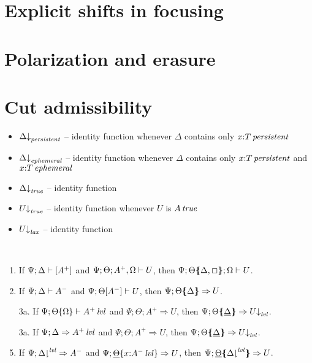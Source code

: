 \section{Explicit shifts in focusing}

\section{Polarization and erasure}

\section{Cut admissibility}

\begin{itemize}
\item $\Delta{\downarrow}_{{\it persistent}}$ -- identity function whenever $\Delta$ contains only $x{:}{T}\,{{\it persistent}}$
\item $\Delta{\downarrow}_{{\it ephemeral}}$ -- identity function whenever $\Delta$ contains only $x{:}{T}\,{{\it persistent}}$ and $x{:}{T}\,{{\it ephemeral}}$
\item $\Delta{\downarrow}_{{\it true}}$ -- identity function
\end{itemize}

\begin{itemize}
\item $U{\downarrow}_{{\it true}}$ -- identity function whenever $U$ is ${A}\,{{\it true}}$
\item $U{\downarrow}_{{\it lax}}$ -- identity function
\end{itemize}



\begin{theorem}~
\begin{enumerate}
\item If ${\Psi};{\Delta} \vdash {[ A^+ ]}$
      and ${\Psi};{\Theta};{A^+,\Omega} \vdash {U}$, 
      then ${\Psi};{{\Theta}\mbox{$\{\hspace{-4pt}\{$}{{\Delta},\Box}\mbox{$\}\hspace{-4pt}\}$}};{\Omega} \vdash {U}$.
\item If ${\Psi};{\Delta} \vdash {A^-}$ 
      and ${\Psi};{\Theta}[{A^-}] \vdash {U}$, 
      then $\Psi; {\Theta}\mbox{$\{\hspace{-4pt}\{$}{\Delta}\mbox{$\}\hspace{-4pt}\}$} \Rightarrow U$.
\item[3a.] If ${\Psi};{{\Theta}\{{\Omega}\mbox\}} \vdash {{A^+}\,{{\it lvl}}}$
      and $\Psi; \Theta; A^+ \Rightarrow U$,
      then $\Psi; {\Theta}\mbox{$\{\hspace{-4pt}\{$}{\underline{\Delta}}\mbox{$\}\hspace{-4pt}\}$} \Rightarrow U{\downarrow}_{{\it lvl}}$.
\item[3a.] If $\Psi; \Delta \Rightarrow {A^+}\,{{\it lvl}}$
      and $\Psi; \Theta; A^+ \Rightarrow U$,
      then $\Psi; {\Theta}\mbox{$\{\hspace{-4pt}\{$}{\underline{\Delta}}\mbox{$\}\hspace{-4pt}\}$} \Rightarrow U{\downarrow}_{{\it lvl}}$.
\item If $\Psi; {\Delta}{\downharpoonright}^{{\it lvl}} \Rightarrow {A^-}$
      and $\Psi; {\underline{\Theta}}\{{x{:}{A^-}\,{{\it lvl}}}\} \Rightarrow U$, 
      then $\Psi; {\underline{\Theta}}\mbox{$\{\hspace{-4pt}\{$}{\ensuremath{{\Delta}{\downharpoonright}^{{\it lvl}}}}\mbox{$\}\hspace{-4pt}\}$} \Rightarrow U$.
\end{enumerate}
\end{theorem}

